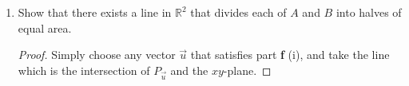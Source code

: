 \documentclass{article}
\newenvironment{problem}[2][Problem]{\begin{trivlist}
\item[\hskip \labelsep {\bfseries #1}\hskip \labelsep {\bfseries #2.}]}{\end{trivlist}}
\begin{document}
\begin{problem}{1}
\begin{enumerate}[label=\textbf{\alph*.}]
\begin{enumerate}[label=(\roman*)]
\begin{proof}
          one that satisfies the antipodal equality property.
        \end{proof}
      \item Show that there exists a line in $\mathbb R^2$ that divides each of
      $A$ and $B$ into halves of equal area.
        \begin{proof}
          Simply choose any vector $\vec u$ that satisfies part \textbf{f} (i),
          and take the line which is the intersection of $P_{\vec u}$ and the
          $xy$-plane.
        \end{proof}
    \end{enumerate}
  \end{enumerate}
\end{problem}
\end{document}
